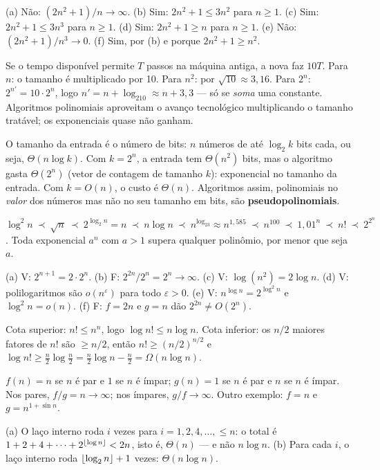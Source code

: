  (a) Não: $(2n^2+1)/n\to\infty$. (b) Sim: $2n^2+1\le3n^2$ para $n\ge1$. (c) Sim: $2n^2+1\le3n^3$ para $n\ge1$. (d) Sim: $2n^2+1\ge n$ para $n\ge1$. (e) Não: $(2n^2+1)/n^3\to0$. (f) Sim, por (b) e porque $2n^2+1\ge n^2$.

 Se o tempo disponível permite $T$ passos na máquina antiga, a nova faz $10T$. Para $n$: o tamanho é multiplicado por 10. Para $n^2$: por $\sqrt{10}\approx3{,}16$. Para $2^n$: $2^{n'}=10\cdot2^n$, logo $n'=n+\log_210\approx n+3{,}3$ --- só se \emph{soma} uma constante. Algoritmos polinomiais aproveitam o avanço tecnológico multiplicando o tamanho tratável; os exponenciais quase não ganham.

 O tamanho da entrada é o número de bits: $n$ números de até $\log_2k$ bits cada, ou seja, $\Theta(n\log k)$. Com $k=2^n$, a entrada tem $\Theta(n^2)$ bits, mas o algoritmo gasta $\Theta(2^n)$ (vetor de contagem de tamanho $k$): exponencial no tamanho da entrada. Com $k=O(n)$, o custo é $\Theta(n)$. Algoritmos assim, polinomiais no \emph{valor} dos números mas não no seu tamanho em bits, são \textbf{pseudopolinomiais}.

 $\log^2n\ \prec\ \sqrt n\ \prec\ 2^{\log_2n}=n\ \prec\ n\log n\ \prec\ n^{\log_23}\approx n^{1{,}585}\ \prec\ n^{100}\ \prec\ 1{,}01^n\ \prec\ n!\ \prec\ 2^{2^n}$. Toda exponencial $a^n$ com $a>1$ supera qualquer polinômio, por menor que seja $a$.

 (a) V: $2^{n+1}=2\cdot2^n$. (b) F: $2^{2n}/2^n=2^n\to\infty$. (c) V: $\log(n^2)=2\log n$. (d) V: polilogaritmos são $o(n^\varepsilon)$ para todo $\varepsilon>0$. (e) V: $n^{\log n}=2^{\log^2n}$ e $\log^2n=o(n)$. (f) F: $f=2n$ e $g=n$ dão $2^{2n}\ne O(2^n)$.

 Cota superior: $n!\le n^n$, logo $\log n!\le n\log n$. Cota inferior: os $n/2$ maiores fatores de $n!$ são $\ge n/2$, então $n!\ge(n/2)^{n/2}$ e $\log n!\ge\frac n2\log\frac n2=\frac n2\log n-\frac n2=\Omega(n\log n)$.

 $f(n)=n$ se $n$ é par e $1$ se $n$ é ímpar; $g(n)=1$ se $n$ é par e $n$ se $n$ é ímpar. Nos pares, $f/g=n\to\infty$; nos ímpares, $g/f\to\infty$. Outro exemplo: $f=n$ e $g=n^{1+\sin n}$.

 (a) O laço interno roda $i$ vezes para $i=1,2,4,\dots,\le n$: o total é $1+2+4+\cdots+2^{\lfloor\log n\rfloor}<2n$, isto é, $\Theta(n)$ --- e não $n\log n$. (b) Para cada $i$, o laço interno roda $\lfloor\log_2n\rfloor+1$ vezes: $\Theta(n\log n)$.

